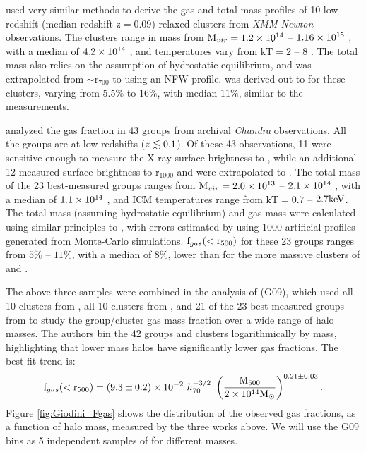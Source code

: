 \textbf{\citet{Arnaud2007}} used very similar methods to derive the
gas and total mass profiles of 10 low-redshift (median redshift z$ =
0.09$) relaxed clusters from \textit{XMM-Newton} observations. The
clusters range in mass from $\textrm{M\ensuremath{_{vir}}} = 1.2\times 10^{14}$ -- $1.16 \times 10^{15}$ \Msun,
with a median of $4.2 \times 10^{14}$ \Msun, and temperatures vary from
$\textrm{kT} = 2$ -- $8$ \keV. The total mass also relies on
the assumption of hydrostatic equilibrium, and was extrapolated from
$\sim$r$_{700}$ to \rfive{} using an NFW profile.  \fg{} was derived
out to \rfive{} for these clusters, varying from $5.5\%$ to $16\%$,
with median $11\%$, similar to the \citet{Vikhlinin2006} measurements.

\textbf{\citet{Sun2009}} analyzed the gas fraction in 43 groups from
archival \textit{Chandra} observations. All the groups are at low
redshifts ($z \lesssim 0.1$). Of these 43 observations, 11 were sensitive
enough to measure the X-ray surface brightness to \rfive{}, while an
additional 12 measured surface brightness to r$_{1000}$ and were
extrapolated to \rfive{}. The total mass of the 23 best-measured
groups ranges from $\textrm{M\ensuremath{_{vir}}} = 2.0\times 10^{13}$ -- $2.1 \times 10^{14}$ \Msun, with a
median of $1.1 \times 10^{14}$ \Msun, and ICM temperatures range from
$\textrm{kT} = 0.7$ -- $2.7 \textrm{keV}$. The total mass (assuming hydrostatic
equilibrium) and gas mass were calculated using similar principles to
\citet{Vikhlinin2006}, with errors estimated by using 1000 artificial
profiles generated from Monte-Carlo simulations. $\textrm{f\ensuremath{_{gas}}}(<\textrm{r\ensuremath{_{500}}})$ for
these 23 groups ranges from $5\%$ -- $11\%$, with a median of $8\%$,
lower than for the more massive clusters of \citet{Vikhlinin2006} and
\citet{Arnaud2007}.

The above three samples were combined in the analysis of
\textbf{\citet{Giodini2009}} (G09), which used all 10 clusters from
\citet{Vikhlinin2006}, all 10 clusters from \citet{Arnaud2007}, and 21
of the 23 best-measured groups from \citet{Sun2009} to study the
group/cluster gas mass fraction over a wide range of halo masses. The
authors bin the 42 groups and clusters logarithmically by mass,
highlighting that lower mass halos have significantly lower gas
fractions. The best-fit trend is:
\begin{equation}
\textrm{f\ensuremath{_{gas}}}(<\textrm{r\ensuremath{_{500}}}) = (9.3 \pm 0.2)\times 10^{-2}~h_{70}^{-3/2}~
\left(\frac{\textrm{M\ensuremath{_{500}}}}{2\times 10^{14}\textrm{M}_\odot}\right)^{0.21 \pm 0.03}.
\end{equation}
Figure \ref{fig:Giodini_Fgas} shows the distribution of the observed
gas fractions, as a function of halo mass, measured by the three works
above. We will use the G09 bins as 5 independent samples of \fg{} for
different masses. 

\afterpage{\clearpage}

